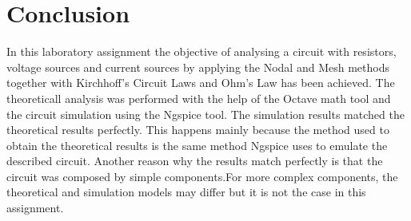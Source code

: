 \section{Conclusion}
\label{sec:conclusion}

In this laboratory assignment the objective of analysing a circuit with resistors, voltage sources and current sources by applying the Nodal and Mesh methods together with Kirchhoff's Circuit Laws and Ohm's Law has been achieved. The theoreticall analysis was performed with the help of the Octave math tool and the circuit simulation using the Ngspice tool. The simulation results matched the theoretical results perfectly. This happens mainly because the method used to obtain the theoretical results is the same method Ngspice uses to emulate the  described circuit. Another reason why the results match perfectly is that the circuit was composed by simple components.For more complex components, the theoretical and simulation models may differ but it is not the case in this assignment.
